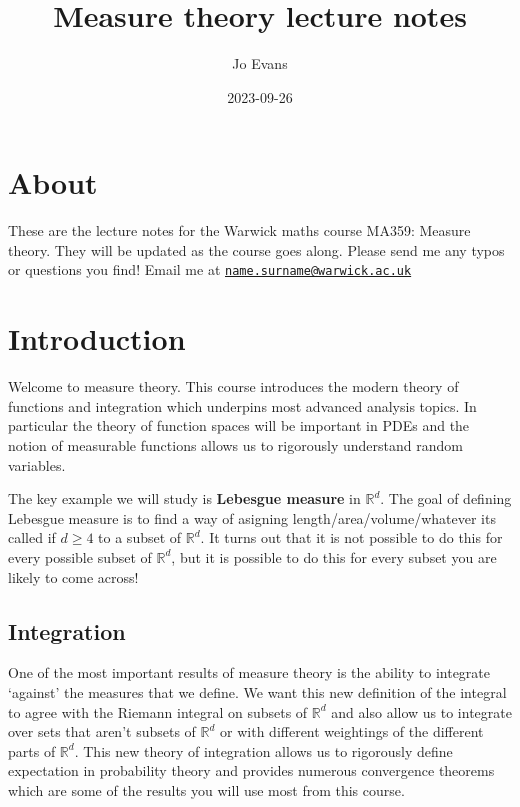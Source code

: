 \documentclass[
]{book}
\title{Measure theory lecture notes}
\author{Jo Evans}
\date{2023-09-26}
\theoremstyle{definition}
\theoremstyle{definition}
\theoremstyle{definition}
\theoremstyle{definition}
\theoremstyle{remark}
\begin{document}
\maketitle

{
\setcounter{tocdepth}{1}
\tableofcontents
}
\hypertarget{about}{%
\chapter*{About}\label{about}}

These are the lecture notes for the Warwick maths course MA359: Measure theory. They will be updated as the course goes along. Please send me any typos or questions you find! Email me at \href{mailto:name.surname@warwick.ac.uk}{\nolinkurl{name.surname@warwick.ac.uk}}

\hypertarget{introduction}{%
\chapter{Introduction}\label{introduction}}

Welcome to measure theory. This course introduces the modern theory of functions and integration which underpins most advanced analysis topics. In particular the theory of function spaces will be important in PDEs and the notion of measurable functions allows us to rigorously understand random variables.

The key example we will study is \textbf{Lebesgue measure} in \(\mathbb{R}^d\). The goal of defining Lebesgue measure is to find a way of asigning length/area/volume/whatever its called if \(d \geq 4\) to a subset of \(\mathbb{R}^d\). It turns out that it is not possible to do this for every possible subset of \(\mathbb{R}^d\), but it is possible to do this for every subset you are likely to come across!

\hypertarget{integration}{%
\section{Integration}\label{integration}}

One of the most important results of measure theory is the ability to integrate `against' the measures that we define. We want this new definition of the integral to agree with the Riemann integral on subsets of \(\mathbb{R}^d\) and also allow us to integrate over sets that aren't subsets of \(\mathbb{R}^d\) or with different weightings of the different parts of \(\mathbb{R}^d\). This new theory of integration allows us to rigorously define expectation in probability theory and provides numerous convergence theorems which are some of the results you will use most from this course.
\end{document}
